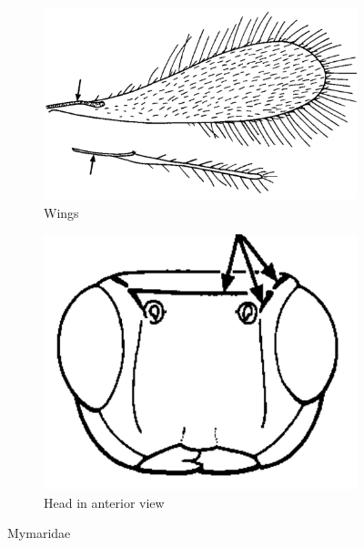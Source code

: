 \documentclass[letterpaper, 11pt]{article}
\begin{document}
\begin{figure}[ht!]
  \centering
\begin{subfigure}[ht!]{0.5\textwidth}
    \includegraphics[width=\textwidth]{MymaridWings}
  \caption{Wings}
  \label{fig:mymarid1}
\end{subfigure}
    \qquad
\begin{subfigure}[ht!]{0.28\textwidth}
    \includegraphics[width=\textwidth]{MymaridHead}
  \caption{Head in anterior view}
  \label{fig:mymarid2}
\end{subfigure}
    \caption{Mymaridae \citep[][pg. 87]{goulet1993hymenoptera}}\label{fig:mymarids}
\end{figure}
\end{document}
